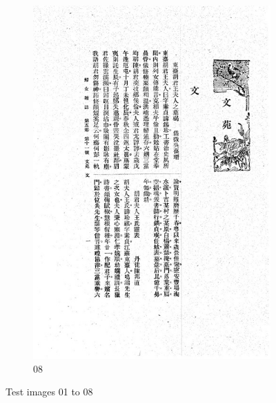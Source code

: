 \documentclass[12pt,twoside]{report}
\begin{document}
\begin{appendices}
\begin{figure}[htbp]
\begin{subfigure}[b]{0.23\linewidth}
        \includegraphics[width=\linewidth]{./figures/testset/08.jpg}
        \caption{08}
        \label{fig:test_08}
    \end{subfigure}
    \caption{Test images 01 to 08}
    \label{fig:test_01_08}
\end{figure}


\end{appendices}
\end{document}

